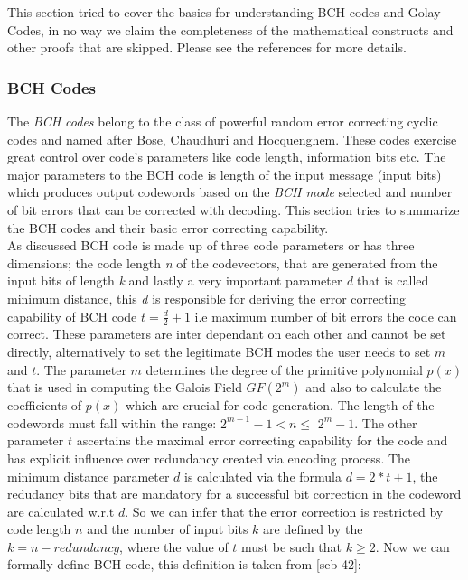 This section tried to cover the basics for understanding BCH codes and Golay Codes, in no way we claim the completeness of the mathematical constructs and other proofs that are skipped. Please see the references for more details.\\

\subsubsection{BCH Codes}
The \emph{BCH codes} belong to the class of powerful random error correcting cyclic codes and named after Bose, Chaudhuri and Hocquenghem. These codes exercise great control over code's parameters like code length, information bits etc. The major parameters to the BCH code is length of the input message (input bits) which produces output codewords based on the \emph{BCH mode} selected and number of bit errors that can be corrected with decoding. This section tries to summarize the BCH codes and
their basic error correcting capability.\\

As discussed BCH code is made up of three code parameters or has three dimensions; the code length \emph{n} of the codevectors, that are generated from the input bits of length \emph{k} and lastly a very important parameter \emph{d} that is called minimum distance, this \emph{d} is responsible for deriving the error correcting capability of BCH code $t = \frac{d}{2} + 1$ i.e maximum number of bit errors the code can correct. These parameters are inter dependant on each other
and cannot be set directly, alternatively to set the legitimate BCH modes the user needs to set $m$ and $t$. The parameter $m$ determines the degree of the primitive polynomial $p(x)$ that is used in computing the Galois Field $GF(2^m)$ and also to calculate the coefficients of $p(x)$ which are crucial for code generation. The length of the codewords must fall within the range: $2^{m-1} - 1 < n \leq$ $2^m - 1$. The other parameter $t$ ascertains the maximal error correcting capability
for the code and has explicit influence over redundancy created via encoding process. The minimum distance parameter $d$ is calculated via the formula $d = 2 * t + 1$, the redudancy bits that are mandatory for a successful bit correction in the codeword are calculated w.r.t $d$. So we can infer that the error correction is restricted by code length $n$ and the number of input bits $k$ are defined by the $k = n - redundancy$, where the value of $t$ must be such that $k \geq 2$. Now we can
formally define BCH code, this definition is taken from [seb 42]:\\

